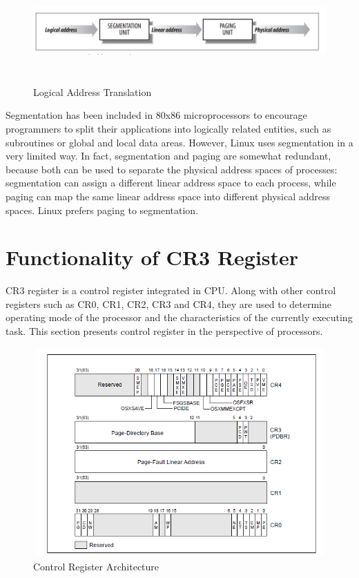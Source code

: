 \begin{figure}[htbp]
	\centering
		\includegraphics[width=13cm, height= 4cm ]{Figures/FigureAppendix1.png}
	\caption{Logical Address Translation \cite{BookLinuxKernel}}
	\label{fig:Logical Address Translation}
\end{figure}

Segmentation has been included in 80x86 microprocessors to encourage programmers to split their applications into logically related
entities, such as subroutines or global and local data areas. However, Linux uses segmentation in a very limited way. In fact, 
segmentation and paging are somewhat redundant, because both can be used to separate the physical address spaces of processes: 
segmentation can assign a different linear address space to each process, while paging can map the same linear address space into 
different physical address spaces. Linux prefers paging to segmentation.

\section{Functionality of CR3 Register \cite{BookIntelManuel}}
CR3 register is a control register integrated in CPU. Along with other control registers such as CR0, CR1, CR2, CR3 and CR4, they 
are used to determine operating mode of the processor and the characteristics of the currently executing task. This section presents
control register in the perspective of processors.

\begin{figure}[htbp]
	\centering
		\includegraphics[width=13cm, height= 8cm ]{Figures/FigureAppendix2.png}
	\caption{Control Register Architecture \cite{BookIntelManuel}}
	\label{fig:Control Register Architecture}
\end{figure}

